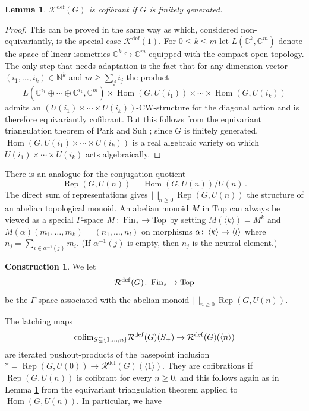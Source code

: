 \documentclass[oneside, a4paper, 12pt]{article}
\numberwithin{equation}{section}
\DeclareMathOperator{\Rep}{Rep}
\DeclareMathOperator{\Hom}{Hom}
\newcommand{\Kdef}{\mathcal{K}^{\mathrm{def}}}
\newcommand{\Rdef}{\mathcal{R}^{\mathrm{def}}}
\newcommand{\Topp}{\mathrm{Top}}
\newcommand{\Fin}{\mathrm{Fin}}
\newcommand{\C}{\mathbb{C}}
\newcommand{\N}{\mathbb{N}}
\newcommand{\co}{\colon\thinspace}
\theoremstyle{plain}
\newtheorem{lemma}[theorem]{Lemma}
\theoremstyle{definition}
\newtheorem{construction}[theorem]{Construction}
\theoremstyle{remark}
\begin{document}
\begin{lemma} \label{lem:cofibrant}
$\Kdef(G)$ is cofibrant if $G$ is finitely generated.
\end{lemma}
\begin{proof}
This can be proved in the same way as \cite[Example 6.3.16]{Global} which, considered non-equivariantly, is the special case $\Kdef(1)$. For $0\leq k\leq m$ let $L(\C^k,\C^m)$ denote the space of linear isometries $\C^k\hookrightarrow \C^m$ equipped with the compact open topology. The only step that needs adaptation is the fact that for any dimension vector $(i_1,\dots,i_k)\in \N^k$ and $m\geq \sum_j i_j$ the product
\[
L(\C^{i_1}\oplus\cdots \oplus \C^{i_k},\C^m)\times \Hom(G,U(i_1))\times \cdots \times \Hom(G,U(i_k))
\]
admits an $(U(i_1)\times \cdots \times U(i_k))$-CW-structure for the diagonal action and is therefore equivariantly cofibrant. But this follows from the equivariant triangulation theorem of Park and Suh \cite[Theorem 1.3]{Park}; since $G$ is finitely generated, $\Hom(G,U(i_1)\times \cdots \times U(i_k))$ is a real algebraic variety on which $U(i_1)\times \cdots \times U(i_k)$ acts algebraically.
\end{proof}

There is an analogue for the conjugation quotient
\[
\Rep(G,U(n))=\Hom(G,U(n))/U(n)\, .
\]
The direct sum of representations gives $\bigsqcup_{n\geq 0} \Rep(G,U(n))$ the structure of an abelian topological monoid. An abelian monoid $M$ in $\Topp$ can always be viewed as a special $\Gamma$-space $M\co \Fin_\ast\to \Topp$ by setting $M(\langle k\rangle)=M^k$ and $M(\alpha)(m_1,\dots,m_k)=(n_1,\dots,n_l)$ on morphisms $\alpha\co \langle k\rangle \to \langle l\rangle$ where $n_j=\sum_{i\in \alpha^{-1}(j)} m_i$. (If $\alpha^{-1}(j)$ is empty, then $n_j$ is the neutral element.)

\begin{construction} \label{cons:rdef} We let
\[
\Rdef(G)\co \Fin_\ast\to \Topp
\]
be the $\Gamma$-space associated with the abelian monoid $\bigsqcup_{n\geq 0} \Rep(G,U(n))$.
\end{construction}

The latching maps
\[
\textnormal{colim}_{S\subsetneq \{1,\dots,n\}} \Rdef(G)(S_+)\to \Rdef(G)(\langle n\rangle)
\]
are iterated pushout-products of the basepoint inclusion $\ast=\Rep(G,U(0))\to \Rdef(G)(\langle 1\rangle)$. They are cofibrations if $\Rep(G,U(n))$ is cofibrant for every $n\geq 0$, and this follows again as in Lemma \ref{lem:cofibrant} from the equivariant triangulation theorem applied to $\Hom(G,U(n))$. In particular, we have
\end{document}
